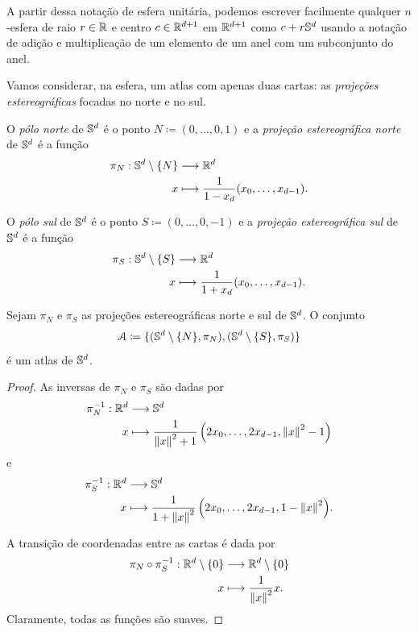 A partir dessa notação de esfera unitária, podemos escrever facilmente qualquer $n$-esfera de raio $r \in \R$ e centro $c \in \R^{d+1}$ em $\R^{d+1}$ como $c + r\S^d$ usando a notação de adição e multiplicação de um elemento de um anel com um subconjunto do anel.

Vamos considerar, na esfera, um atlas com apenas duas cartas: as \emph{projeções estereográficas} focadas no norte e no sul.

\begin{defi}
O \emph{pólo norte} de $\S^d$ é o ponto $N \coloneqq (0,\ldots,0,1)$ e a \emph{projeção estereográfica norte} de $\S^d$ é a função
	\begin{align*}
	\func{\pi_N}{\S^d \setminus\{N\}}{\R^d}{x}{\frac{1}{1-x_d}(x_0,\ldots,x_{d-1})}.
	\end{align*}

O \emph{pólo sul} de $\S^d$ é o ponto $S \coloneqq (0,\ldots,0,-1)$ e a \emph{projeção estereográfica sul} de $\S^d$ é a função
	\begin{align*}
	\func{\pi_S}{\S^d \setminus\{S\}}{\R^d}{x}{\frac{1}{1+x_d}(x_0,\ldots,x_{d-1})}.
	\end{align*}
\end{defi}

\begin{prop}
Sejam $\pi_N$ e $\pi_S$ as projeções estereográficas norte e sul de $\S^d$. O conjunto
	\begin{equation*}
	\atlas \coloneqq \{(\S^d \setminus\{N\},\pi_N),(\S^d \setminus\{S\},\pi_S)\}
	\end{equation*}
é um atlas de $\S^d$.
\end{prop}
\begin{proof}
As inversas de $\pi_N$ e $\pi_S$ são dadas por
	\begin{align*}
	\func{\pi_N\inv}{\R^d}{\S^d}{x}{\frac{1}{\nor{x}^2 + 1}\left(2x_0,\ldots,2x_{d-1},\nor{x}^2 - 1\right)}
	\end{align*}
e
	\begin{align*}
	\func{\pi_S\inv}{\R^d}{\S^d}{x}{\frac{1}{1+\nor{x}^2}\left(2x_0,\ldots,2x_{d-1},1-\nor{x}^2\right)}.
	\end{align*}

A transição de coordenadas entre as cartas é dada por
	\begin{align*}
	\func{\pi_N \circ \pi_S\inv}{\R^d \setminus\{0\}}{\R^d \setminus\{0\}}{x}{\frac{1}{\nor{x}^2}x}.
	\end{align*}
Claramente, todas as funções são suaves.
\end{proof}

